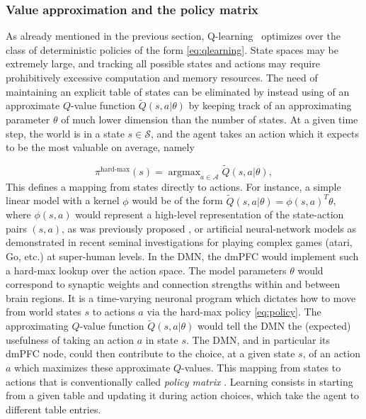 \documentclass[10pt,letterpaper]{article}
\DeclareMathOperator{\argmax}{argmax}
\begin{document}
\subsubsection{Value approximation and the policy matrix}
\label{sec:policymat}
As already mentioned in the previous section, Q-learning~\citep{watkins92} optimizes over the class of
deterministic policies of the form \eqref{eq:qlearning}. State spaces may be extremely large,
and tracking all possible states and actions may require prohibitively excessive
computation and memory resources.
The need of maintaining an explicit table of
states can be eliminated by instead using of an approximate $Q$-value function $\tilde{Q}(s,a|\theta)$
by keeping track of an approximating parameter $\theta$ of much lower dimension than the number of states.
At a given time step, the world is in a state $s \in \mathcal S$, and the agent takes an
action which it expects to be the most valuable on average, namely

\begin{equation}
  \pi^{\text{hard-max}}(s) = \argmax_{a \in \mathcal A}\tilde{Q}(s, a|\theta),
  \label{eq:policy}
\end{equation}
This defines a mapping from states directly to actions.
For instance, a simple linear model with a kernel $\phi$ would be of the
form $\tilde{Q}(s, a|\theta) = \phi(s,a)^T\theta$, where
$\phi(s,a)$ would represent a high-level representation of the state-action pairs
$(s,a)$, as was previously proposed \citep{songNIPS2016},
or artificial neural-network models as demonstrated in recent
seminal investigations
\citep{mnih2015,silver2016mastering} for playing complex games (atari, Go, etc.) at super-human levels.
In the DMN, the dmPFC would implement such a hard-max lookup
over the action space.
The model
parameters $\theta$ would correspond to synaptic weights and connection strengths within and between
brain regions. It is a time-varying neuronal program which dictates how to move from world states $s$ to actions $a$ via the hard-max policy \eqref{eq:policy}.
The approximating $Q$-value function $\tilde{Q}(s, a|\theta)$ would tell the DMN the (expected) usefulness of taking an action $a$ in state $s$.
The DMN, and in particular its dmPFC node, could then contribute to the choice, at a given state $s$, of an action $a$ which maximizes these approximate
$Q$-values.
This mapping from states to actions that is conventionally called
\textit{policy matrix} \citep{mnih2015,silver2016mastering}.
Learning consists in starting from a given table and
updating it during action choices,
which take the agent to different table entries.
\end{document}
